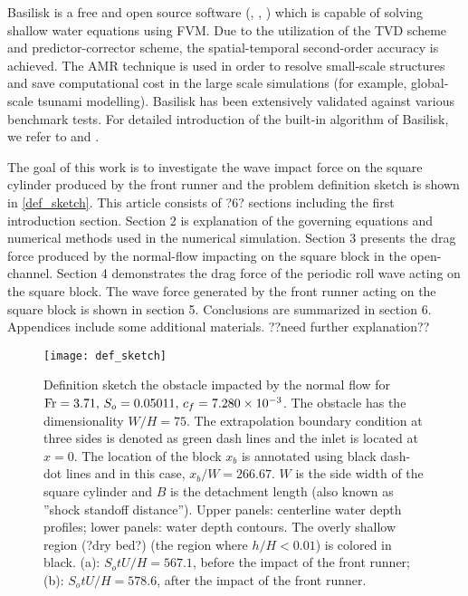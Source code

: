 \documentclass{jfm}
\newcommand{\fr}{{\rm{Fr}}}
\begin{document}
\begin{itemize}
	Basilisk is a free and open source software (\cite{Popinet2021}, \cite{Popinet2015}, \cite{Popinet2003}) which is capable of solving shallow water equations using FVM. Due to the utilization of the TVD scheme and predictor-corrector scheme, the spatial-temporal second-order accuracy is achieved. The AMR technique is used in order to resolve small-scale structures and save computational cost in the large scale simulations (for example, global-scale tsunami modelling). Basilisk has been extensively validated against various benchmark tests.  For detailed introduction of the built-in algorithm of Basilisk, we refer to \cite{Popinet2015} and \cite{Popinet2011}. 
\end{itemize}

The goal of this work is to investigate the wave impact force on the square cylinder produced by the front runner and the problem definition sketch is shown in \autoref{def_sketch}. This article consists of ?6? sections including the first introduction section.  Section 2 is explanation of the governing equations and numerical methods used in the numerical simulation. Section 3 presents the drag force produced by the normal-flow impacting on the square block in the open-channel. Section 4 demonstrates the drag force of the periodic roll wave acting on the square block. The wave force generated by the front runner acting on the square block is shown in section 5. Conclusions are summarized in section 6. Appendices include some additional materials. ??need further explanation??


\begin{figure}
	\centerline{\texttt{[image: def\_sketch]}}
	\caption{Definition sketch the obstacle impacted by the normal flow for $\fr=3.71,\,S_o=0.05011,\,c_f=7.280\times10^{-3}$. The obstacle has the dimensionality $W/H=75$. The extrapolation boundary condition at three sides is denoted as green dash lines and the inlet is located at $x=0$. The location of the block $x_b$ is annotated using black dash-dot lines and in this case, $x_b/W=266.67$. $W$ is the side width of the square cylinder and $B$ is the detachment length (also known as ''shock standoff distance''). Upper panels: centerline water depth profiles; lower panels: water depth contours. The overly shallow region (?dry bed?) (the region where $h/H<0.01$) is colored in black. (a): $S_otU/H=567.1$, before the impact of the front runner; (b): $S_otU/H=578.6$, after the impact of the front runner.}
	\label{def_sketch}
\end{figure}
\end{document}

